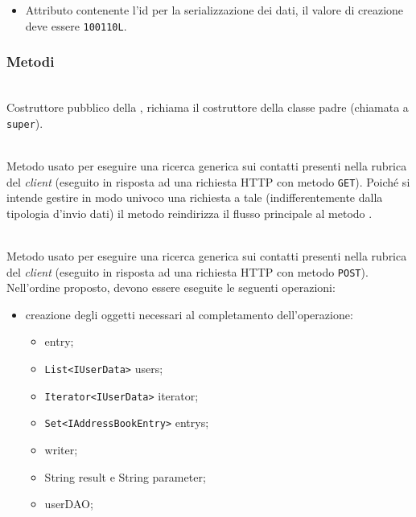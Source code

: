 \begin{itemize}
	\item{}
	Attributo contenente l'id per la serializzazione dei dati, il valore di creazione deve essere \texttt{100110L}.
\end{itemize}

\subsubsection*{Metodi}

\begin{description}
	\item{}\\
	Costruttore pubblico della , richiama il costruttore della classe padre (chiamata a \texttt{super}).
	
	\item{}\\
	Metodo usato per eseguire una ricerca generica sui contatti presenti nella rubrica del \textit{client} (eseguito in risposta ad una richiesta HTTP con metodo \texttt{GET}). Poiché si intende gestire in modo univoco una richiesta a tale  (indifferentemente dalla tipologia d'invio dati) il metodo reindirizza il flusso principale al metodo .
	
	\item{}\\	
	Metodo usato per eseguire una ricerca generica sui contatti presenti nella rubrica del \textit{client} (eseguito in risposta ad una richiesta HTTP con metodo \texttt{POST}). Nell'ordine proposto, devono essere eseguite le seguenti operazioni:
	\begin{itemize}
		\item creazione degli oggetti necessari al completamento dell'operazione:
		\begin{itemize}
			\item {} entry;
			\item \texttt{List<IUserData>} users;
			\item \texttt{Iterator<IUserData>} iterator;
			\item \texttt{Set<IAddressBookEntry>} entrys;
			\item {} writer;
			\item String result e String parameter;
			\item {} userDAO;
		\end{itemize}
		

\end{itemize}
\end{description}

